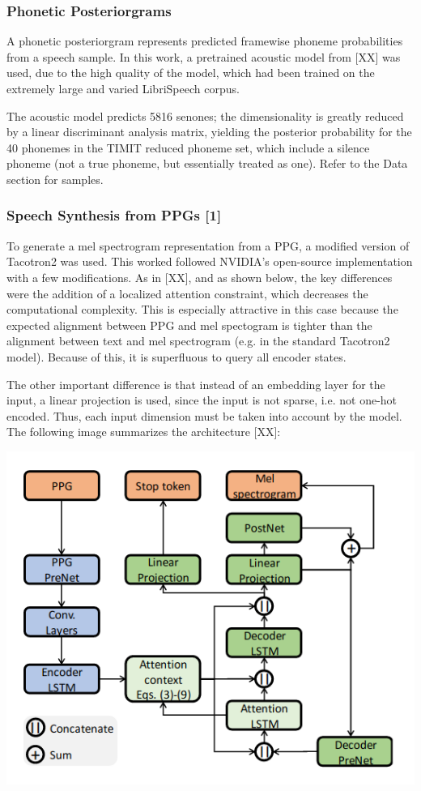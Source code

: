 \subsubsection{Phonetic Posteriorgrams}
A phonetic posteriorgram represents predicted framewise phoneme probabilities from a speech sample.
In this work, a pretrained acoustic model from [XX] was used, due to the high quality of the model, which had 
been trained on the extremely large and varied LibriSpeech corpus.

The acoustic model predicts 5816 senones; the dimensionality is greatly reduced by a linear discriminant 
analysis matrix, yielding the posterior probability for the 40 phonemes in the TIMIT reduced phoneme set, 
which include a silence phoneme (not a true phoneme, but essentially treated as one). Refer to the Data section for samples.


\subsubsection{Speech Synthesis from PPGs [1]}
%
To generate a mel spectrogram representation from a PPG, a modified version of Tacotron2 
was used. This worked followed NVIDIA's open-source implementation with a few modifications.
As in [XX], and as shown below, the key differences were the addition of a localized attention constraint,
which decreases the computational complexity. This is especially attractive in this case because 
the expected alignment between PPG and mel spectogram is tighter than the alignment between 
text and mel spectrogram (e.g. in the standard Tacotron2 model). Because of this, it is 
superfluous to query all encoder states.

The other important difference is that instead of an embedding layer for the input, a 
linear projection is used, since the input is not sparse, i.e. not one-hot encoded. Thus, 
each input dimension must be taken into account by the model.
The following image summarizes the architecture [XX]:

\includegraphics[width=15cm]{img/img_ppg2mel.png}


